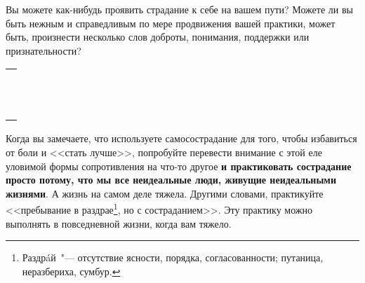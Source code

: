 \begin{itemize}
	\itemWritingHand Вы можете как-нибудь проявить страдание к себе на вашем пути? Можете ли вы быть нежным и справедливым по мере продвижения вашей практики, может быть, произнести несколько слов доброты, понимания, поддержки или признательности?
\end{itemize}

\setlength{\extrarowheight}{2mm}
\begin{tabularx}{0.96\textwidth}{X}
	\\
	\arrayrulecolor{gray}\hline\\
	\hline\\
	\hline\\
	\hline\\
	\hline\\
	\hline\\	
	\hline\\
	\hline\\
	\hline\\
	\hline\\
	\hline\\
	\hline\\
	\hline\\
\end{tabularx}
\setlength{\extrarowheight}{0mm}


\newpage
{} \label{Being_a_Compassionate_Mess}

Когда вы замечаете, что используете самосострадание для того, чтобы избавиться от боли и <<стать лучше>>, попробуйте перевести внимание с этой еле уловимой формы сопротивления на что-то другое \textbf{и практиковать сострадание просто потому, что мы все неидеальные люди, живущие неидеальными жизнями}. А жизнь на самом деле тяжела. Другими словами, практикуйте <<пребывание в раздрае\footnote{Раздр\'{a}й~"--- отсутствие ясности, порядка, согласованности; путаница, неразбериха, сумбур.}, но с состраданием>>. Эту практику можно выполнять в повседневной жизни, когда вам тяжело. 

